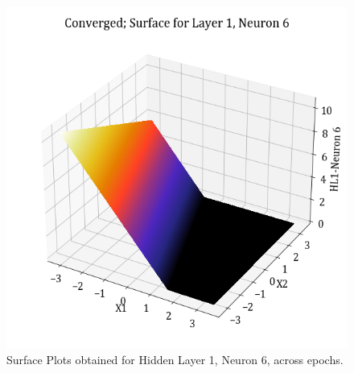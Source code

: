 \documentclass[11pt,a4paper]{article}
\begin{document}
\begin{figure}[H]
    \includegraphics[scale=0.4]{images/1B_MLFFNN_conv_HL1_N6.png}
    \caption{Surface Plots obtained for Hidden Layer 1, Neuron 6, across epochs.}
\end{figure}
\end{document}
